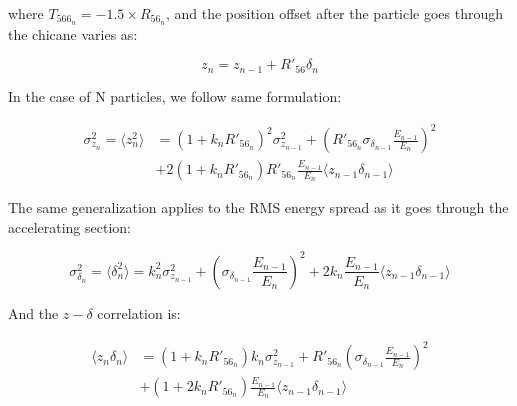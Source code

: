 \documentclass[a4paper,12pt]{article}
\begin{document}
\noindent where $T_{566_n}=-1.5 \times R_{56_n}$, and the position offset after the particle goes through the chicane varies as:

\begin{equation}
  z_{n}=z_{n-1}+R'_{56} \delta_n
\end{equation}

\noindent In the case of N particles, we follow same formulation:

\begin{align}
  \sigma^2_{z_n} = \langle z_n^2 \rangle &=
    \left( 1+k_n R'_{56_n} \right)^2 \sigma^2_{z_{n-1}} + \left( R'_{56_n} \sigma_{\delta_{n-1}} \frac{E_{n-1}}{E_n}\right)^2 \nonumber \\
    &+ 2\left(1+k_n R'_{56_n}\right) R'_{56_n} \frac{E_{n-1}}{E_n}\langle z_{n-1}\delta_{n-1} \rangle
\end{align}

\noindent The same generalization applies to the RMS energy spread as it goes through the accelerating section:

\begin{equation}
  \sigma^2_{\delta_{n}} = \langle \delta_n^2 \rangle = k^2_n \sigma^2_{z_{n-1}} + \left( \sigma_{\delta_{n-1}} \frac{E_{n-1}}{E_n} \right)^2 + 2 k_n  \frac{E_{n-1}}{E_n} \langle z_{n-1}\delta_{n-1} \rangle
\end{equation}

\noindent And the $z-\delta$ correlation is:

\begin{align}
  \langle z_{n}\delta_{n} \rangle &=
    \left( 1+k_n R'_{56_n} \right) k_n \sigma^2_{z_{n-1}} + R'_{56_n} \left( \sigma_{\delta_{n-1}} \frac{E_{n-1}}{E_n} \right)^2 \nonumber \\
    &+ \left(1+2k_n R'_{56_n}\right) \frac{E_{n-1}}{E_n}\langle z_{n-1}\delta_{n-1} \rangle
\end{align}
\end{document}
